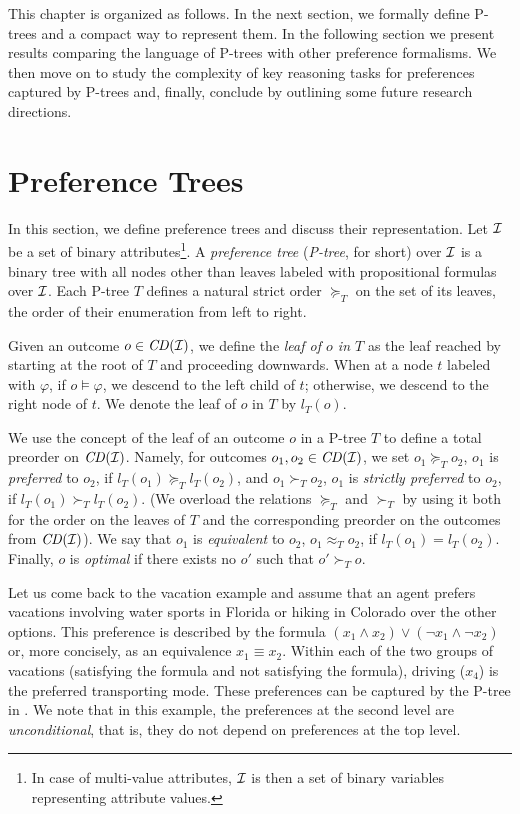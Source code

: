 This chapter is organized as follows. In the next section, we formally 
define P-trees and a compact way to represent them. In the following 
section we present results comparing the language of P-trees with other 
preference formalisms. We then move on to study the complexity of key 
reasoning tasks for preferences captured by P-trees and, finally, 
conclude by outlining some future research directions.


\section{Preference Trees}

In this section, we define preference trees and discuss their
representation. Let $\mathcal{I}$ be a set of binary attributes\footnote{
	In case of multi-value attributes, $\mathcal{I}$ is then a set of
	binary variables representing attribute values.
}. 
A \emph{preference tree} (\textit{P-tree}, for short) over $\mathcal{I}$ is
a binary tree with all nodes other than 
leaves labeled with propositional formulas over $\mathcal{I}$. Each P-tree 
$T$ defines a natural strict order $\succeq_T$ on the set of its leaves, 
the order of their enumeration from left to right. 

Given an outcome $o \in \mathit{CD}(\mathcal{I})$, we define the \emph{leaf of $o$ in $T$}
as the leaf reached by starting at the root of $T$ and proceeding 
downwards. When at a node $t$ labeled with $\varphi$, if $o\models \varphi$, 
we descend to the left child of $t$; otherwise, we descend to the right node 
of $t$. We denote the leaf of $o$ in $T$ by $l_T(o)$.

We use the concept of the leaf of an outcome $o$ in a P-tree $T$ to 
define a total preorder on $\mathit{CD}(\mathcal{I})$. Namely, for outcomes
$o_1, o_2\in \mathit{CD}(\mathcal{I})$, 
we set $o_1\succeq_T o_2$, $o_1$ is \emph{preferred} to $o_2$, if $l_T(o_1) \succeq_T l_T(o_2)$, and
$o_1\succ_T o_2$, $o_1$ is \emph{strictly preferred} to $o_2$, 
if $l_T(o_1) \succ_T l_T(o_2)$.
(We overload the relations $\succeq_T$ and $\succ_T$ 
by using it both for the order on the leaves of $T$ 
and the corresponding preorder on the outcomes from $\mathit{CD}(\mathcal{I})$). 
We say that $o_1$ is 
\emph{equivalent} to $o_2$, $o_1 \approx_T o_2$, if $l_T(o_1)=l_T(o_2)$. 
Finally, $o$ is \emph{optimal} if there exists no 
$o'$ such that $o' \succ_T o$.

Let us come back to the vacation example and assume that an agent 
prefers vacations involving water sports in Florida or hiking in Colorado
over the other options. This preference is described by the formula
$(x_1\land x_2) \lor (\neg x_1 \land \neg x_2)$ or, more concisely, as 
an equivalence $x_1 \equiv x_2$.
Within each of the two groups of vacations 
(satisfying the formula and not satisfying the formula), 
driving ($x_4$) is the preferred transporting mode. These preferences can be captured by the P-tree in
. We note that in this example, the preferences at 
the second level are \emph{unconditional}, that is, they do not depend on 
preferences at the top level. 

